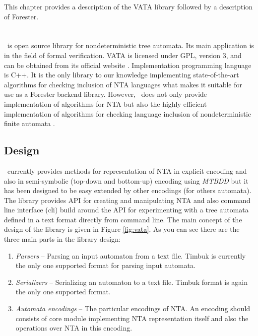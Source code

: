 This chapter provides a description of the VATA library followed by a description of Forester.

\section{\Vata}
\label{sec:VATA}

\Vata\ is open source library for nondeterministic tree automata.
Its main application is in the field of formal verification.
VATA is licensed under GPL, version 3, and can be obtained from its official website \cite{www:libvata}.
Implementation programming language is C++.
It is the only library to our knowledge implementing state-of-the-art algorithms for checking inclusion of NTA languages
what makes it suitable for use as a Forester backend library.
However, \vata\ does not only provide implementation of algorithms for NTA but also the highly efficient implementation of
algorithms for checking language inclusion of nondeterministic finite automata \cite{bt:hruska}.

\subsection{Design}
\Vata\ currently provides methods for representation of NTA in explicit encoding and also in semi-symbolic (top-down and bottom-up)
encoding using \emph{MTBDD} but it has been designed to be easy extended by other encodings (for others automata).
The library provides API for creating and manipulating NTA and also command line interface (cli) build around
the API for experimenting with a tree automata defined in a text format directly from command line.
The main concept of the design of the library is given in Figure \ref{fig:vata}.
As you can see there are the three main parts in the library design:
\begin{enumerate}
	\item \emph{Parsers} -- Parsing an input automaton from a text file.
		Timbuk \cite{timbuk} is currently the only one supported format for parsing input automata.
	\item \emph{Serializers} -- Serializing an automaton to a text file.
		Timbuk format is again the only one supported format.
	\item \emph{Automata encodings} -- The particular encodings of NTA.
		An encoding should consists of core module implementing NTA representation itself
		and also the operations over NTA in this encoding.
\end{enumerate}

